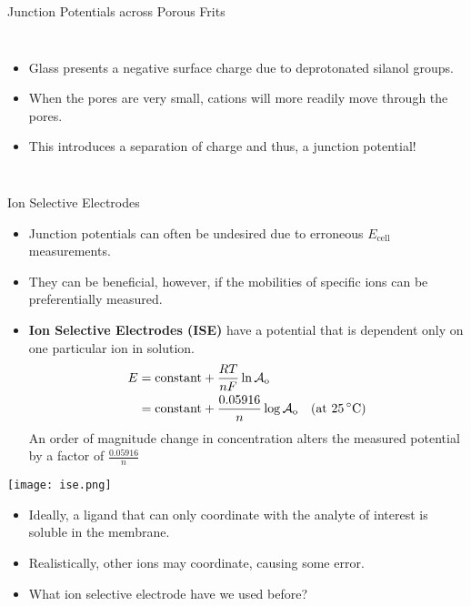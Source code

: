 \documentclass[notes=show]{beamer}
\begin{document}
\begin{frame}{Junction Potentials across Porous Frits}
	\begin{columns}
		\begin{itemize}
			\item Glass presents a negative surface charge due to
				deprotonated silanol groups.
			\item When the pores are very small,\footnotemark{}
				cations will more readily move through the
				pores.
			\item This introduces a separation of charge and thus, a
				junction potential!
		\end{itemize}
	\end{columns}
	
\end{frame}

\begin{frame}[allowframebreaks]{Ion Selective Electrodes}
	\begin{itemize}
		\item Junction potentials can often be undesired due to
			erroneous $E_\text{cell}$ measurements.
		\item They can be beneficial, however, if the mobilities of
			\alert{specific} ions can be \alert{preferentially}
			measured.
		\item \textbf{Ion Selective Electrodes (ISE)} have a potential
			that is dependent \alert{only} on one particular ion in
			solution.
			\begin{align*}
				E &= \text{constant} + \frac{RT}{nF} \ln
				\mathcal{A}_\text{o} \\
				&= \text{constant} + \frac{0.05916}{n} \log
				\mathcal{A}_\text{o} \quad \text{(at
				\SI{25}{\celsius})}
			\end{align*}
			An order of magnitude change in concentration alters the
			measured potential by a factor of $\frac{0.05916}{n}$
	\end{itemize}

	\framebreak
	
	\begin{center}
		\texttt{[image: ise.png]}
	\end{center}

	\begin{itemize}
		\item Ideally, a ligand that can \alert{only} coordinate with
			the analyte of interest is soluble in the membrane.
		\item Realistically, other ions \alert{may} coordinate, causing
			some error.
		\item What ion selective electrode have we used before?

	\end{itemize}
\end{frame}
\end{document}
